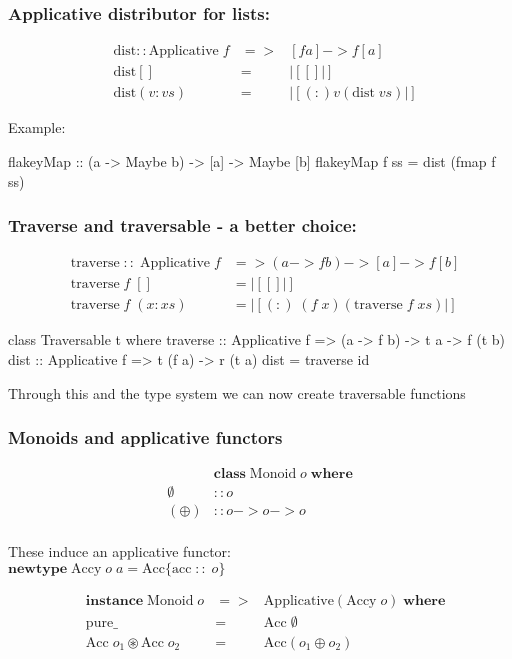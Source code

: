 \documentclass[18pt]{beamer}
\begin{document}
\begin{frame}[fragile] \frametitle{Applicative distributor for lists:}
\begin{align*}
&\mathrm{dist} :: \mathrm{Applicative} \; f &=>& [f a] -> f [a]\\
&\mathrm{dist} [] &=& |[ [] |]\\
  &\mathrm{dist} (v : vs) &=&  |[ (:) v (\mathrm{dist} \; vs) |]
\end{align*}

Example:\\
\begin{code}
flakeyMap :: (a -> Maybe b) -> [a] -> Maybe [b]
flakeyMap f ss = dist (fmap f ss)
\end{code}
\end{frame}

\begin{frame}[fragile] \frametitle{Traverse and traversable - a better choice:}

\begin{align*}
&\mathrm{traverse} \; :: \; \mathrm{Applicative} \; f &=> (a -> f b) -> [a] -> f [b]\\
&\mathrm{traverse} \; f \; [] &= |[ [] |]\\
&\mathrm{traverse} \; f \; (x :xs) &= |[(:)\; (f \; x)(\mathrm{traverse} \; f \; xs)|]
\end{align*}

\begin{code}
class Traversable t where
traverse :: Applicative f => (a -> f b) -> t a -> f (t b)
dist  :: Applicative f => t (f a) -> r (t a)
dist = traverse id           
\end{code}
Through this and the type system we can now create traversable functions
\end{frame}

\begin{frame}[fragile]\frametitle{Monoids and applicative functors}
\begin{align*}
&\mathbf{class} \; \mathrm{Monoid} \; o \; \mathbf{where}\\
\emptyset &:: o\\
(\oplus) &:: o -> o -> o
\end{align*}  \\
These induce an applicative functor:\\

$\mathbf{newtype} \; \mathrm{Accy} \; o\; a = \mathrm{Acc} \{\mathrm{acc} \; :: \;o \}$

\begin{align*}
&\mathbf{instance} \; \mathrm{Monoid} \; o &=>& \mathrm{Applicative} (\mathrm{Accy}\; o) \; \mathbf{where}\\
&\mathrm{pure} \_ &=& \mathrm{Acc} \; \emptyset\\
&\mathrm{Acc} \; o_1 \circledast \mathrm{Acc} \; o_2 &=& \mathrm{Acc}(o_1 \oplus o_2)
\end{align*}
\end{frame}
\end{document}
